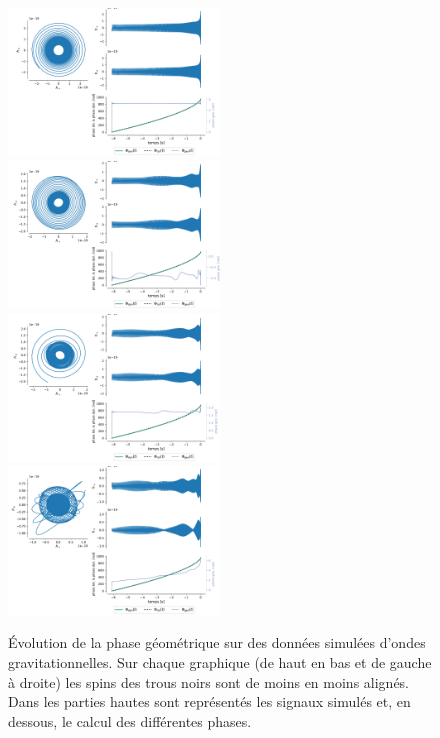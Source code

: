 \begin{figure}[h]
	\includegraphics[width=0.5\textwidth]{fig/part-3/GW_plot_1.pdf}\hfill
	\includegraphics[width=0.5\textwidth]{fig/part-3/GW_plot_2.pdf}\\
	\includegraphics[width=0.5\textwidth]{fig/part-3/GW_plot_3.pdf}\hfill
	\includegraphics[width=0.5\textwidth]{fig/part-3/GW_plot_4.pdf}
	\caption[Évolution de la phase géométrique sur des données simulées d'ondes gravitationnelles]{Évolution de la phase géométrique sur des données simulées d'ondes gravitationnelles. Sur chaque graphique (de haut en bas et de gauche à droite) les spins des trous noirs sont de moins en moins alignés. Dans les parties hautes sont représentés les signaux simulés et, en dessous, le calcul des différentes phases.}
	\label{fig:phase_g2GW}
\end{figure}

